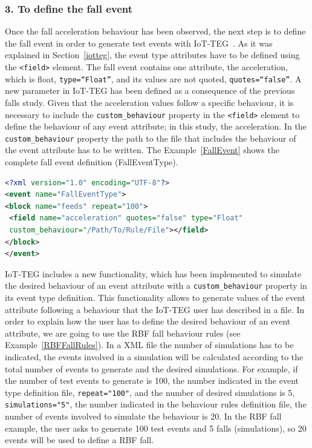 \documentclass[journal]{IEEEtran}
\begin{document}
\subsubsection*{3. To define the fall event} Once the fall acceleration behaviour has been observed, the next step is to define the 
fall event in order to generate test events with IoT-TEG~\cite{TesisGutierrez2017,Gutierrez2017}. As it was explained in 
Section~\ref{iotteg}, the event type attributes have
to be defined using the \texttt{\small{<field>}} element. The fall event contains one attribute, the acceleration, which is float, 
\texttt{\small{type=``Float''}}, and its values are not quoted, \texttt{\small{quotes=``false''}}. A new parameter in IoT-TEG has been defined as a 
consequence of the previous falls study. Given that the acceleration values follow a specific behaviour, it is necessary to include 
the \texttt{\small{custom\_behaviour}} property in the \texttt{\small{<field>}} element to define the behaviour of any event attribute; 
in this study, the acceleration. In the \texttt{\small{custom\_behaviour}} property the path to the file that includes the behaviour of the 
event attribute has to be written. The Example~\ref{FallEvent} shows the complete fall event definition (FallEventType).

\begin{lstlisting}[basicstyle=\ttfamily\scriptsize,language=XML,caption={Fall event type definition},label=FallEvent]
<?xml version="1.0" encoding="UTF-8"?>
<event name="FallEventType">
<block name="feeds" repeat="100">
 <field name="acceleration" quotes="false" type="Float" 
 custom_behaviour="/Path/To/Rule/File"></field>
</block>
</event>
\end{lstlisting}

IoT-TEG includes a new functionality, which has been implemented to simulate the desired behaviour of an 
event attribute with a \texttt{\small{custom\_behaviour}} property in its event type definition. This functionality 
allows to generate values of the event attribute following a behaviour
that the IoT-TEG user has described in a file.
In order to explain how the user has to define the desired behaviour of an event attribute, we are going
to use the RBF fall behaviour rules (see Example~\ref{RBFFallRules}). In a XML file the number of simulations has to be
indicated, the events involved in a simulation will be calculated according to the total number of events
to generate and the desired simulations. For example, if the number of test events to generate is 100, 
the number indicated in the event type definition file, \texttt{\small{repeat="100"}}, and the number of desired 
simulations is 5, \texttt{\small{simulations="5"}}, the number indicated in the behaviour rules definition file, 
the number of events involved to simulate the behaviour is 20. In the RBF fall example, the user asks to 
generate 100 test events and 5 falls (simulations), so 20 events will be used to define a RBF fall.
\end{document}
